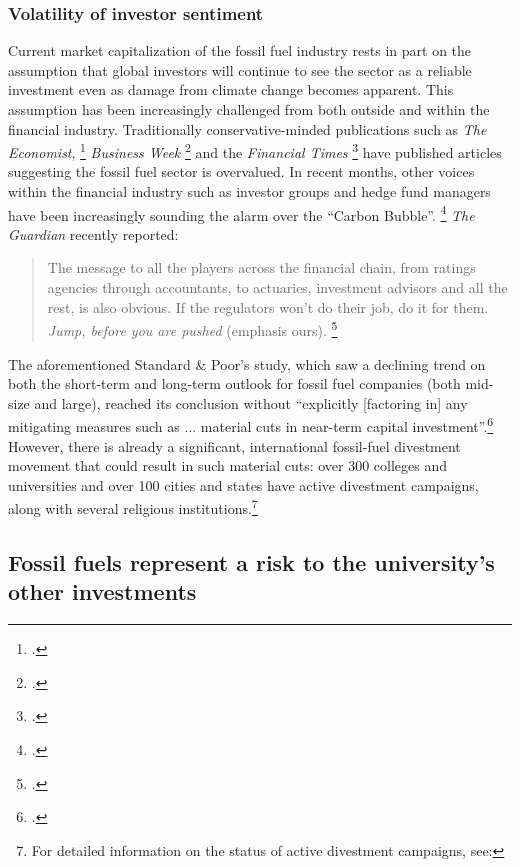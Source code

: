 \documentclass[10pt]{article}
\begin{document}
\subsubsection {Volatility of investor sentiment}



Current market capitalization of the fossil fuel industry rests in part on the assumption that global investors will continue to see the sector as a reliable investment even as damage from climate change becomes apparent. 
This assumption has been increasingly challenged from both outside and within the financial industry. 
Traditionally conservative-minded publications such as \emph{The Economist}, \footcite{EconomistUnburnable} \emph{Business Week} \footcite{BusinessWeekOvervalued} and the \emph{Financial Times} \footcite{FTOvervalued} have published articles suggesting the fossil fuel sector is overvalued. 
In recent months, other voices within the financial industry such as investor groups and hedge fund managers have been increasingly sounding the alarm over the ``Carbon Bubble''. \footcite{JeremyGrantham} 
\emph{The Guardian} recently reported:
\begin{quote}
The message to all the players across the financial chain, from ratings agencies through accountants, to actuaries, investment advisors and all the rest, is also obvious. If the regulators won't do their job, do it for them. \emph{Jump, before you are pushed} (emphasis ours). \footcite{Guardian6Trillion}
\end{quote}
The aforementioned Standard \& Poor's study, which saw a declining trend on both the short-term and long-term outlook for fossil fuel companies (both mid-size and large), reached its conclusion without ``explicitly [factoring in] any mitigating measures such as ... material cuts in near-term capital investment''.\footcite{SandPConstrained}
However, there is already a significant, international fossil-fuel divestment movement that could result in such material cuts: over 300 colleges and universities and over 100 cities and states  have active divestment campaigns, along with several religious institutions.\footnote{For detailed information on the status of active divestment campaigns, see: }




	\subsection {Fossil fuels represent a risk to the university's other investments}
\end{document}
